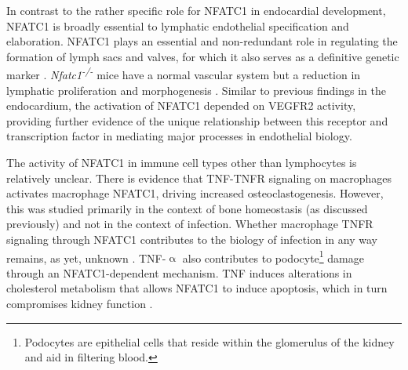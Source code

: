 In contrast to the rather specific role for NFATC1 in endocardial development, NFATC1 is broadly essential to lymphatic endothelial specification and elaboration. NFATC1 plays an essential and non\hyp{}redundant role in regulating the formation of lymph sacs and valves, for which it also serves as a definitive genetic marker \citep{Shin2019}. \textit{Nfatc1\textsuperscript{\hyp{}/\hyp{}}} mice have a normal vascular system but a reduction in lymphatic proliferation and morphogenesis \citep{Kulkarni2009, Norrmen2009}. Similar to previous findings in the endocardium, the activation of NFATC1 depended on VEGFR2 activity, providing further evidence of the unique relationship between this receptor and transcription factor in mediating major processes in endothelial biology. 

The activity of NFATC1 in immune cell types other than lymphocytes is relatively unclear. There is evidence that TNF\hyp{}TNFR signaling on macrophages activates macrophage NFATC1, driving increased osteoclastogenesis. However, this was studied primarily in the context of bone homeostasis (as discussed previously) and not in the context of infection. Whether macrophage TNFR signaling through NFATC1 contributes to the biology of infection in any way remains, as yet, unknown \citep{Yarilina2011}. TNF\hyp{}$\upalpha$ also contributes to podocyte\footnote{Podocytes are epithelial cells that reside within the glomerulus of the kidney and aid in filtering blood.} damage through an NFATC1\hyp{}dependent mechanism. TNF induces alterations in cholesterol metabolism that allows NFATC1 to induce apoptosis, which in turn compromises kidney function \citep{Pedigo2016, Zhang2013}. 


